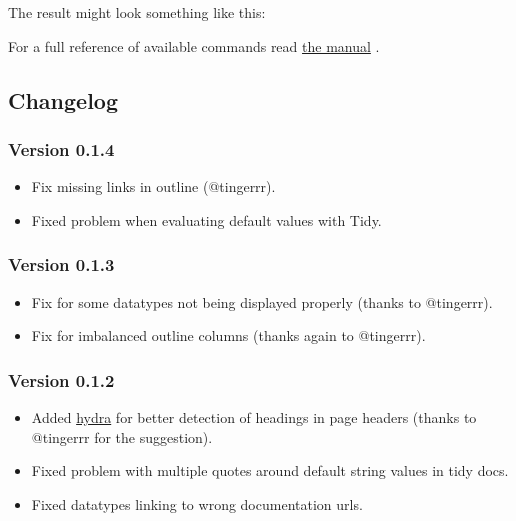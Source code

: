 The result might look something like this:


For a full reference of available commands read
\href{https://github.com/typst/packages/raw/main/packages/preview/mantys/0.1.4/docs/mantys-manual.pdf}{the
manual} .

\subsection{Changelog}\label{changelog}

\subsubsection{Version 0.1.4}\label{version-0.1.4}

\begin{itemize}
\tightlist
\item
  Fix missing links in outline (@tingerrr).
\item
  Fixed problem when evaluating default values with Tidy.
\end{itemize}

\subsubsection{Version 0.1.3}\label{version-0.1.3}

\begin{itemize}
\tightlist
\item
  Fix for some datatypes not being displayed properly (thanks to
  @tingerrr).
\item
  Fix for imbalanced outline columns (thanks again to @tingerrr).
\end{itemize}

\subsubsection{Version 0.1.2}\label{version-0.1.2}

\begin{itemize}
\tightlist
\item
  Added \href{https://typst.app/universe/package/hydra}{hydra} for
  better detection of headings in page headers (thanks to @tingerrr for
  the suggestion).
\item
  Fixed problem with multiple quotes around default string values in
  tidy docs.
\item
  Fixed datatypes linking to wrong documentation urls.
\end{itemize}

